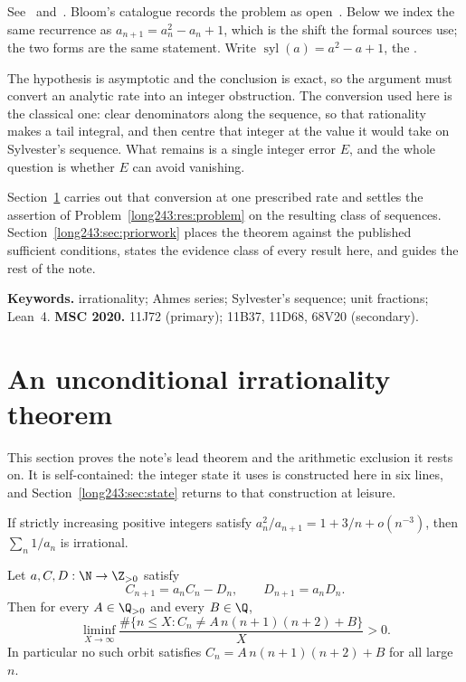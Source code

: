 \documentclass[11pt]{article}
\newcommand{\sylnext}{\operatorname{syl}}
\begin{document}
\noindent See~\cite[p.~64]{erdosgraham1980} and~\cite[p.~105]{erdos1988}.
Bloom's catalogue records the problem as open~\cite{erdosproblems}.
Below we index the same recurrence as
$a_{n+1}=a_n^{2}-a_n+1$, which is the shift the formal sources use; the two
forms are the same statement.  Write $\sylnext(a)=a^{2}-a+1$, the
.

The hypothesis is asymptotic and the conclusion is exact, so the argument must
convert an analytic rate into an integer obstruction.  The conversion used here
is the classical one: clear denominators along the sequence, so that
rationality makes a tail integral, and then centre that integer at the value it
would take on Sylvester's sequence.  What remains is a single integer error
$E$, and the whole question is whether $E$ can avoid vanishing.

Section~\ref{long243:sec:cubicrate} carries out that conversion at one prescribed rate
and settles the assertion of Problem~\ref{long243:res:problem} on the resulting class
of sequences.  Section~\ref{long243:sec:priorwork} places the theorem against the
published sufficient conditions, states the evidence class of every result
here, and guides the rest of the note.

\medskip
\noindent\textbf{Keywords.} irrationality; Ahmes series; Sylvester's sequence;
unit fractions; Lean~4.
\qquad
\textbf{MSC 2020.} 11J72 (primary); 11B37, 11D68, 68V20 (secondary).

\section{An unconditional irrationality theorem}\label{long243:sec:cubicrate}

This section proves the note's lead theorem and the arithmetic exclusion it
rests on.  It is self-contained: the integer state it uses is constructed here
in six lines, and Section~\ref{long243:sec:state} returns to that construction at
leisure.

\begin{theorem}\label{long243:res:cubicrate}
If strictly increasing positive integers satisfy
$a_n^2/a_{n+1}=1+3/n+o(n^{-3})$, then $\sum_n1/a_n$ is irrational.
\end{theorem}

\begin{theorem}\label{long243:res:cubicexclusion}
Let $a,C,D:\N\to\Z_{>0}$ satisfy
\begin{equation}\label{long243:eq:cubicorbit}
 C_{n+1}=a_nC_n-D_n,\qquad D_{n+1}=a_nD_n .
\end{equation}
Then for every $A\in\Q_{>0}$ and every $B\in\Q$,
\[
 \liminf_{X\to\infty}
 \frac{\#\{n\le X:C_n\ne A\,n(n+1)(n+2)+B\}}{X}>0 .
\]
In particular no such orbit satisfies $C_n=A\,n(n+1)(n+2)+B$ for all
large $n$.
\end{theorem}
\end{document}
